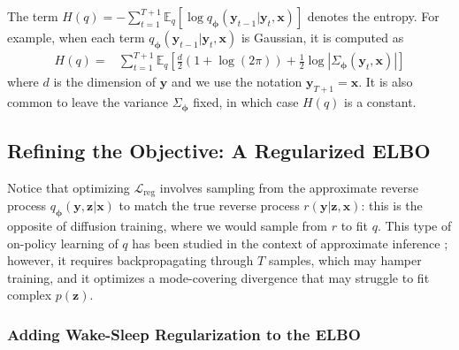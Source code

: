 \documentclass[letterpaper]{article} %
\newcommand{\bx}{\mathbf{x}}
\newcommand{\bz}{\mathbf{z}}
\newcommand{\by}{\mathbf{y}}
\newcommand\KL{\text{KL}}
\let\oldphi\phi
\renewcommand{\phi}{{\boldsymbol \oldphi}}
\begin{document}
The term $H(q) = - \sum_{t=1}^{T+1} \mathbb{E}_q [\log q_\phi(\by_{t-1}|\by_t,\bx)]$ denotes the entropy. For example, when each term $q_\phi(\by_{t-1}|\by_t,\bx)$ is Gaussian, it is computed as
\begin{align}
    H(q) = 
    & \sum_{t=1}^{T+1} \mathbb{E}_{q} \left [ \frac{d}{2} \left( 1 + \log(2\pi) \right) + \frac{1}{2} \log \left| \Sigma_\phi(\by_t, \bx) \right| \right ] \nonumber
\end{align}
where $d$ is the dimension of $\by$ and we use the notation $\by_{T+1} = \bx$. 
It is also common to leave the variance $\Sigma_\phi$ fixed, in which case $H(q)$ is a constant.

\subsection{Refining the Objective: A Regularized ELBO}

Notice that optimizing $\mathcal{L}_\text{reg}$
involves sampling from the approximate reverse process $q_\phi(\by,\bz|\bx)$ to match the true reverse process $r(\by | \bz, \bx)$: this is the opposite of diffusion training, where we would sample from $r$ to fit $q$. This type of on-policy learning of $q$ has been studied in the context of approximate inference \citep{zhang2021path}; however, it requires backpropagating through $T$ samples, which may hamper training, and it optimizes a mode-covering divergence that may struggle to fit complex $p(\bz)$. 

\subsubsection{Adding Wake-Sleep Regularization to the ELBO}
\end{document}
